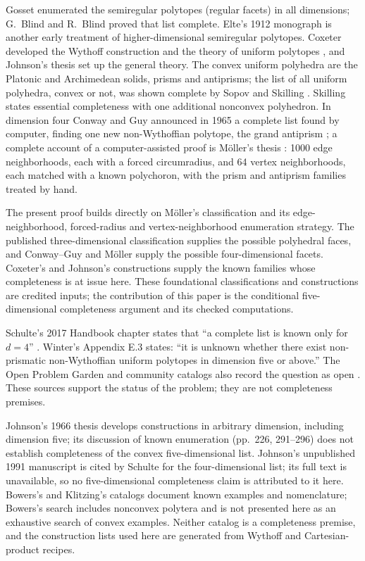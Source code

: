 \documentclass[11pt]{article}
\theoremstyle{definition}
\theoremstyle{remark}
\begin{document}
Gosset \cite{Gosset1900} enumerated the semiregular polytopes (regular
facets) in all dimensions; G.~Blind and R.~Blind \cite{Blind1991}
proved that list complete. Elte's 1912 monograph \cite{Elte1912} is another
early treatment of higher-dimensional semiregular polytopes. Coxeter developed the Wythoff construction and the theory of
uniform polytopes \cite{CoxeterRP,CoxeterLHM1954}, and Johnson's thesis
\cite{Johnson1966} set up the general theory. The convex uniform polyhedra
are the Platonic and Archimedean solids, prisms and antiprisms; the list of
all uniform polyhedra, convex or not, was shown complete by Sopov
\cite{Sopov1970} and Skilling \cite{Skilling1975}. Skilling states essential completeness with one additional nonconvex polyhedron. In dimension four Conway and Guy announced in 1965 a
complete list found by computer, finding one new non-Wythoffian
polytope, the grand antiprism \cite{ConwayGuy1965}; a complete account
of a computer-assisted proof is Möller's thesis
\cite{Moller2004thesis,Moller2004}: 1000
edge neighborhoods, each with a forced circumradius, and 64 vertex
neighborhoods, each matched with a known polychoron, with the prism and
antiprism families treated by hand.

The present proof builds directly on Möller's classification and its
edge-neighborhood, forced-radius and vertex-neighborhood enumeration
strategy. The published three-dimensional classification supplies the
possible polyhedral faces, and Conway--Guy and Möller supply the possible
four-dimensional facets. Coxeter's and Johnson's constructions supply the
known families whose completeness is at issue here. These foundational
classifications and constructions are credited inputs; the contribution of
this paper is the conditional five-dimensional completeness argument and
its checked computations.

Schulte's 2017 Handbook chapter states that ``a complete list is known
only for $d=4$'' \cite{Schulte2017}. Winter's Appendix E.3 states:
``it is unknown whether there exist non-prismatic non-Wythoffian uniform
polytopes in dimension five or above.'' \cite[p.~167]{Winter2021}
The Open Problem Garden and community catalogs also record the question
as open \cite{OPG,PolytopeWiki}. These sources support the status of the
problem; they are not completeness premises.

Johnson's 1966 thesis \cite{Johnson1966} develops constructions in
arbitrary dimension, including dimension five; its discussion of known
enumeration (pp.~226, 291--296) does not establish completeness of the
convex five-dimensional list.
Johnson's unpublished 1991 manuscript \cite{Johnson1991} is cited by
Schulte for the four-dimensional list; its full text is unavailable, so
no five-dimensional completeness claim is attributed to it here.
Bowers's and Klitzing's catalogs \cite{Bowers,Klitzing} document known
examples and nomenclature; Bowers's search includes nonconvex polytera
and is not presented here as an exhaustive search of convex examples.
Neither catalog is a completeness premise, and the construction lists
used here are generated from Wythoff and Cartesian-product recipes.
\end{document}
